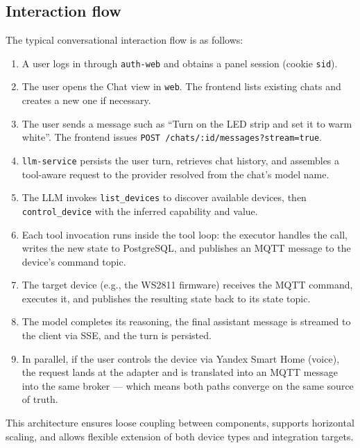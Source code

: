 \documentclass[a4paper,12pt]{article}
\begin{document}
\subsection{Interaction flow}

The typical conversational interaction flow is as follows:

\begin{enumerate}
  \item A user logs in through \verb|auth-web| and obtains a panel session (cookie \verb|sid|).
  \item The user opens the Chat view in \verb|web|. The frontend lists existing chats and creates a new one if necessary.
  \item The user sends a message such as ``Turn on the LED strip and set it to warm white''. The frontend issues \verb|POST /chats/:id/messages?stream=true|.
  \item \verb|llm-service| persists the user turn, retrieves chat history, and assembles a tool-aware request to the provider resolved from the chat's model name.
  \item The LLM invokes \verb|list_devices| to discover available devices, then \verb|control_device| with the inferred capability and value.
  \item Each tool invocation runs inside the tool loop: the executor handles the call, writes the new state to PostgreSQL, and publishes an MQTT message to the device's command topic.
  \item The target device (e.g., the WS2811 firmware) receives the MQTT command, executes it, and publishes the resulting state back to its state topic.
  \item The model completes its reasoning, the final assistant message is streamed to the client via SSE, and the turn is persisted.
  \item In parallel, if the user controls the device via Yandex Smart Home (voice), the request lands at the adapter and is translated into an MQTT message into the same broker --- which means both paths converge on the same source of truth.
\end{enumerate}

This architecture ensures loose coupling between components, supports horizontal scaling, and allows flexible extension of both device types and integration targets.

\newpage

\end{document}
